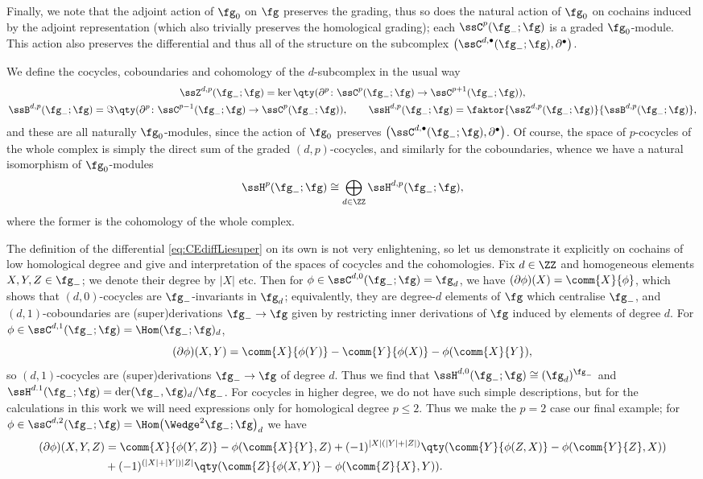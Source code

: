 Finally, we note that the adjoint action of $\fg_0$ on $\fg$ preserves the grading, thus so does the natural action of $\fg_0$ on cochains induced by the adjoint representation (which also trivially preserves the homological grading); each $\ssC^p(\fg_-;\fg)$ is a graded $\fg_0$-module. This action also preserves the differential and thus all of the structure on the subcomplex $\bigl(\ssC^{d,\bullet}(\fg_-;\fg),\partial^\bullet\bigr)$.


We define the cocycles, coboundaries and cohomology of the $d$-subcomplex in the usual way
\begin{gather*}
	\ssZ^{d,p}(\fg_-;\fg) = \ker\qty(\partial^p\colon \ssC^p(\fg_-;\fg)\to \ssC^{p+1}(\fg_-;\fg)),	\\
	\ssB^{d,p}(\fg_-;\fg) = \Im\qty(\partial^p\colon \ssC^{p-1}(\fg_-;\fg)\to \ssC^{p}(\fg_-;\fg)),	\qquad
	\ssH^{d,p}(\fg_-;\fg) = \faktor{\ssZ^{d,p}(\fg_-;\fg)}{\ssB^{d,p}(\fg_-;\fg)},
\end{gather*}
and these are all naturally $\fg_0$-modules, since the action of $\fg_0$ preserves $\bigl(\ssC^{d,\bullet}(\fg_-;\fg),\partial^\bullet\bigr)$. Of course, the space of $p$-cocycles of the whole complex is simply the direct sum of the graded $(d,p)$-cocycles, and similarly for the coboundaries, whence we have a natural isomorphism of $\fg_0$-modules
\[
	\ssH^p(\fg_-;\fg) \cong \bigoplus_{d\in\ZZ}\ssH^{d,p}(\fg_-;\fg),
\]
where the former is the cohomology of the whole complex.

The definition of the differential \eqref{eq:CEdiffLiesuper} on its own is not very enlightening, so let us demonstrate it explicitly on cochains of low homological degree and give and interpretation of the spaces of cocycles and the cohomologies. Fix $d\in\ZZ$ and homogeneous elements $X,Y,Z\in\fg_-$; we denote their degree by $|X|$ etc. Then for $\phi\in\ssC^{d,0}(\fg_-;\fg)=\fg_d$, we have
$(\partial \phi)(X) = \comm{X}{\phi}$,
which shows that $(d,0)$-cocycles are $\fg_-$-invariants in $\fg_d$; equivalently, they are degree-$d$ elements of $\fg$ which centralise $\fg_-$, and $(d,1)$-coboundaries are (super)derivations $\fg_-\to\fg$ given by restricting inner derivations of $\fg$ induced by elements of degree $d$. For $\phi\in\ssC^{d,1}(\fg_-;\fg)=\Hom(\fg_-;\fg)_d$,
\[
	(\partial \phi)(X,Y) = \comm{X}{\phi(Y)} - \comm{Y}{\phi(X)} -\phi(\comm{X}{Y}),
\]
so $(d,1)$-cocycles are (super)derivations $\fg_-\to\fg$ of degree $d$. Thus we find that $\ssH^{d,0}(\fg_-;\fg) \cong (\fg_d)^{\fg_-}$ and $\ssH^{d.1}(\fg_-;\fg)=\operatorname{der}(\fg_-,\fg)_d/\fg_-$. For cocycles in higher degree, we do not have such simple descriptions, but for the calculations in this work we will need expressions only for homological degree $p\leq 2$. Thus we make the $p=2$ case our final example; for $\phi\in\ssC^{d,2}(\fg_-;\fg)=\Hom\bigl(\Wedge^2\fg_-;\fg\bigr)_d$ we have
\begin{align*}
	(\partial \phi)(X,Y,Z) &= \comm{X}{\phi(Y,Z)} - \phi(\comm{X}{Y},Z) + (-1)^{|X|(|Y|+|Z|)} \qty( \comm{Y}{\phi(Z,X)} - \phi(\comm{Y}{Z},X) )\\
		& + (-1)^{(|X|+|Y|)|Z|} \qty( \comm{Z}{\phi(X,Y)} - \phi(\comm{Z}{X},Y) ).
\end{align*}


